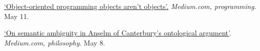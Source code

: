 	\item {}
	{}
	{
\href{https://blog.usejournal.com/object-oriented-programming-objects-arent-objects-48c1c4c68d8c}{`Object-oriented programming objects aren't objects'.} \emph{Medium.com, programming}. May 11}.
	{}
	\item \datedsubsectionnarrow{}
{}
{
	\href{https://medium.com/@jacobarchambault/on-semantic-ambiguity-in-anselm-of-canterburys-ontological-argument-aea6817561dd}{`On semantic ambiguity in Anselm of Canterbury's ontological argument'}. 		\emph{Medium.com, philosophy}. May 8.}
{}
